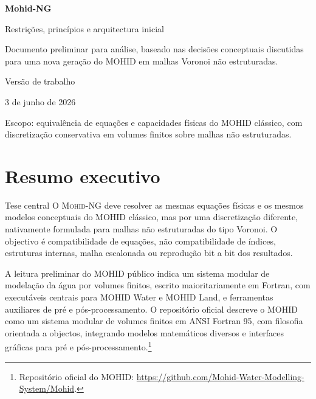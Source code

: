 \documentclass[11pt,a4paper]{article}
\newcommand{\docdate}{3 de junho de 2026}
\newcommand{\mohidng}{\textsc{Mohid-NG}}
\begin{document}
\begin{titlepage}
\pagecolor{MohidBlue}
\color{white}
\vspace*{18mm}
{\sffamily\fontsize{34}{38}\selectfont\bfseries Mohid-NG}\par
\vspace{4mm}
{\sffamily\fontsize{18}{22}\selectfont Restrições, princípios e arquitectura inicial}\par
\vspace{12mm}
\noindent\colorbox{MohidCyan}{\parbox{0.93\textwidth}{\vspace{4mm}\color{white}\sffamily\large Documento preliminar para análise, baseado nas decisões conceptuais discutidas para uma nova geração do MOHID em malhas Voronoi não estruturadas.\vspace{4mm}}}
\vfill
{\sffamily\large Versão de trabalho}\par
{\sffamily\large \docdate}\par
\vspace{8mm}
{\sffamily\small Escopo: equivalência de equações e capacidades físicas do MOHID clássico, com discretização conservativa em volumes finitos sobre malhas não estruturadas.}\par
\end{titlepage}
\nopagecolor
\color{MohidInk}

\tableofcontents
\newpage

\section{Resumo executivo}

\begin{principlebox}{Tese central}
O \mohidng{} deve resolver as mesmas equações físicas e os mesmos modelos conceptuais do MOHID clássico, mas por uma discretização diferente, nativamente formulada para malhas não estruturadas do tipo Voronoi. O objectivo é compatibilidade de equações, não compatibilidade de índices, estruturas internas, malha escalonada ou reprodução bit a bit dos resultados.
\end{principlebox}

A leitura preliminar do MOHID público indica um sistema modular de modelação da água por volumes finitos, escrito maioritariamente em Fortran, com executáveis centrais para MOHID Water e MOHID Land, e ferramentas auxiliares de pré e pós-processamento. O repositório oficial descreve o MOHID como um sistema modular de volumes finitos em ANSI Fortran 95, com filosofia orientada a objectos, integrando modelos matemáticos diversos e interfaces gráficas para pré e pós-processamento.\footnote{Repositório oficial do MOHID: \url{https://github.com/Mohid-Water-Modelling-System/Mohid}.}
\end{document}
